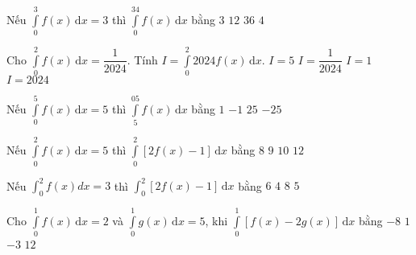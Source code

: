 \begin{ex}%
	Nếu $\displaystyle\int\limits_0^3f(x)\mathrm{\,d}x=3$ thì $\displaystyle\int\limits_0^34f(x)\mathrm{\,d}x$ bằng
	\choice
	{$3$}
	{\True $12$}
	{$36$}
	{$4$}
\end{ex}
\begin{ex}%
	Cho $\displaystyle\int\limits_0^2f(x)\mathrm{\,d}x=\dfrac{1}{2024}$. Tính $I=\displaystyle\int\limits_0^2 2024f(x)\mathrm{\,d}x$.
	\choice
	{$I=5$}
	{$I=\dfrac{1}{2024}$}
	{\True $I=1$}
	{$I=2024$}
\end{ex}
\begin{ex}%
	Nếu $\displaystyle\int\limits_0^5f(x)\mathrm{\,d}x=5$ thì $\displaystyle\int\limits_5^05f(x)\mathrm{\,d}x$ bằng
	\choice
	{$1$}
	{$-1$}
	{$25$}
	{\True $-25$}
\end{ex}
\begin{ex}%
	Nếu $\displaystyle\int\limits_0^2f(x)\mathrm{\,d}x=5$ thì $\displaystyle\int\limits_0^2\left[2f(x)-1\right]\mathrm{\,d}x$ bằng
	\choice
	{\True $8$}
	{$9$}
	{$10$}
	{$12$}
\end{ex}
\begin{ex}%
	Nếu $\displaystyle\int_0^2 f(x) d x=3$ thì $\displaystyle\int_0^2\left[2f(x)-1\right]\mathrm{\,d}x$ bằng
	\choice
	{$6$}
	{\True $4$}
	{$8$}
	{$5$}
\end{ex}
\begin{ex}%
	Cho $\displaystyle\int\limits_0^1f(x)\mathrm{\,d}x=2$ và $\displaystyle\int\limits_0^1g(x)\mathrm{\,d}x=5$, khi $\displaystyle\int\limits_0^1\left[f(x)-2g(x)\right]\mathrm{\,d}x$ bằng
	\choice
	{\True $-8$}
	{$1$}
	{$-3$}
	{$12$}
\end{ex}
